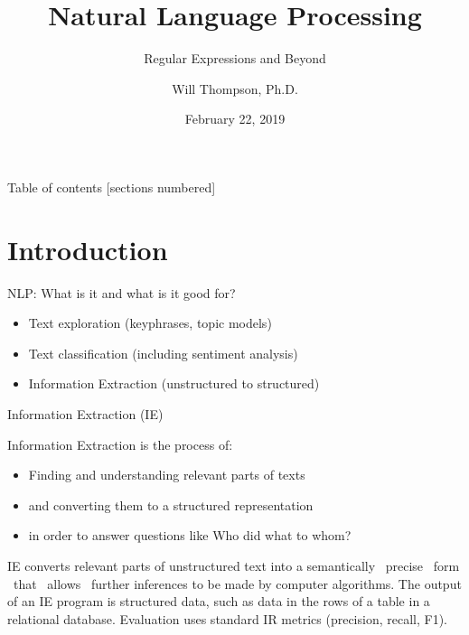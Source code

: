 \documentclass[10pt]{beamer}
\title{Natural Language Processing}
\subtitle{Regular Expressions and Beyond}
\date{February 22, 2019}
\author{Will Thompson, Ph.D.}
\begin{document}
\maketitle

\begin{frame}{Table of contents}
  [sections numbered]
  \tableofcontents[hideallsubsections]
\end{frame}

\section{Introduction}

\begin{frame}[fragile]{NLP: What is it and what is it good for?}
\begin{itemize}
  \item Text exploration (keyphrases, topic models)
  \item Text classification (including sentiment analysis)
  \item Information Extraction (unstructured to structured)
\end{itemize}
\end{frame}

\begin{frame}{Information Extraction (IE)}

Information Extraction is the process of:

\begin{itemize}
  \item Finding and understanding relevant parts of texts
  \item \hspace{1em} and converting them to a structured representation
  \item \hspace{1em} in order to answer questions like \alert{Who did what to whom?}
\end{itemize}

\vspace{1em}
IE converts relevant parts of unstructured text into a \alert{semantically  precise}  form  that  allows  further inferences to be made by computer algorithms. The output of an IE program is \alert{structured data}, such as data in the rows of a table in a relational database. Evaluation uses standard IR metrics (precision, recall, F1).

\end{frame}
\end{document}
